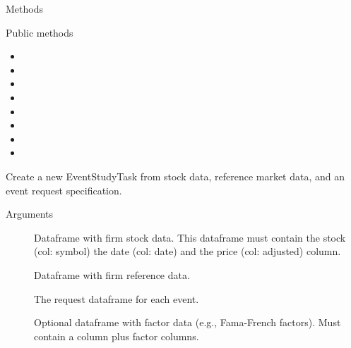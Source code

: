 \documentclass[a4paper]{book}
\begin{document}
%
\begin{Section}{Methods}
%
\begin{SubSection}{Public methods}
\begin{itemize}

\item{} 
\item{} 
\item{} 
\item{} 
\item{} 
\item{} 
\item{} 
\item{} 

\end{itemize}

\end{SubSection}



\hypertarget{method-EventStudyTask-initialize}{}
%
\begin{SubSection}{}
Create a new EventStudyTask from stock data, reference
market data, and an event request specification.
%

%
\begin{SubSubSection}{Arguments}

\begin{description}

\item[] Dataframe with firm
stock data. This dataframe must contain the
stock (col: symbol) the date (col: date)
and the price (col: adjusted) column.
\item[] Dataframe with firm
reference data.
\item[] The request dataframe for
each event.
\item[] Optional dataframe with factor data
(e.g., Fama-French factors). Must contain a 
column plus factor columns.


\end{description}
\end{SubSubSection}
\end{SubSection}
\end{Section}
\end{document}
